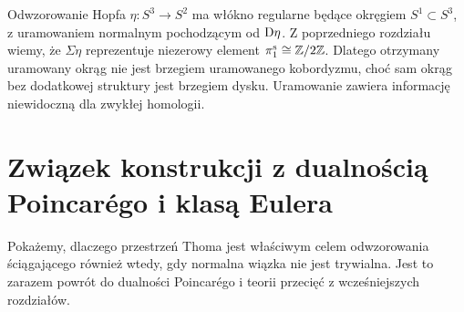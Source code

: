 \begin{przyklad}
Odwzorowanie Hopfa $\eta:S^3\to S^2$ ma włókno
regularne będące okręgiem $S^1\subset S^3$, z
uramowaniem normalnym pochodzącym od $\mathrm D\eta$.
Z poprzedniego rozdziału wiemy, że $\Sigma\eta$
reprezentuje niezerowy element $\pi_1^{\mathrm s}\cong\mathbb{Z}/2\mathbb{Z}$.
Dlatego otrzymany uramowany okrąg nie jest brzegiem
uramowanego kobordyzmu, choć sam okrąg bez dodatkowej
struktury jest brzegiem dysku. Uramowanie zawiera
informację niewidoczną dla zwykłej homologii.
\end{przyklad}

\section{Związek konstrukcji z dualnością Poincarégo i klasą Eulera}
Pokażemy, dlaczego przestrzeń Thoma jest właściwym celem
odwzorowania ściągającego również wtedy, gdy normalna
wiązka nie jest trywialna. Jest to zarazem powrót do
dualności Poincarégo i teorii przecięć z wcześniejszych rozdziałów.

